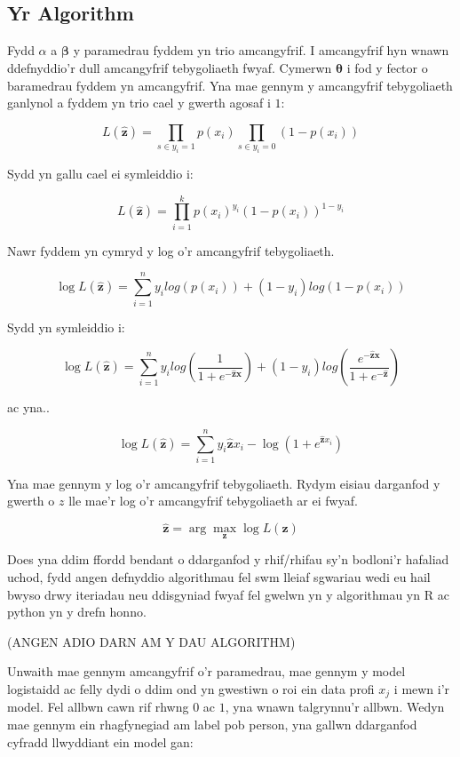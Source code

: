 \subsection{Yr Algorithm}

Fydd $\alpha$ a $\mathbf{\beta}$ y paramedrau fyddem yn trio amcangyfrif. I amcangyfrif hyn wnawn ddefnyddio'r dull amcangyfrif tebygoliaeth fwyaf. Cymerwn $\hat{\mathbf{\theta}}$ i fod y fector o baramedrau fyddem yn amcangyfrif. Yna mae gennym y amcangyfrif tebygoliaeth ganlynol a fyddem yn trio cael y gwerth agosaf i $1$:

$$ L(\hat{\mathbf{z}}) = \prod_{s \in y_{i}=1} p(x_i) \prod_{s \in y_{i}=0} (1 - p(x_i))$$

Sydd yn gallu cael ei symleiddio i:

$$ L(\hat{\mathbf{z}}) = \prod_{i=1}^{k} p(x_i)^{y_i} (1 - p(x_i))^{1-y_i} $$

Nawr fyddem yn cymryd y log o'r amcangyfrif tebygoliaeth.

$$ \log L(\hat{\mathbf{z}}) = \sum_{i=1}^{n} y_{i} log(p(x_{i})) + (1-y_{i}) log(1-p(x_{i})) $$

Sydd yn symleiddio i:

$$ \log L(\hat{\mathbf{z}}) = \sum_{i=1}^{n} y_{i} log(\frac{1}{1 + e^{-\hat{\mathbf{z}}\mathbf{x}}}) + (1 - y_i) log(\frac{e^{-\hat{\mathbf{z}}\mathbf{x}}}{1 + e^{-\hat{\mathbf{z}}}}) $$

ac yna..

$$ \log L(\hat{\mathbf{z}}) = \sum_{i=1}^{n} y_i \hat{\mathbf{z}} x_i - \log(1 + e^{\hat{\mathbf{z}} x_i}) $$

Yna mae gennym y log o'r amcangyfrif tebygoliaeth. Rydym eisiau darganfod y gwerth o $z$ lle mae'r log o'r amcangyfrif tebygoliaeth ar ei fwyaf.

$$ \hat{\mathbf{z}} = \arg \max_{\mathbf{z}} \log L(\mathbf{z})  $$

Does yna ddim ffordd bendant o ddarganfod y rhif/rhifau sy'n bodloni'r hafaliad uchod, fydd angen defnyddio algorithmau fel swm lleiaf sgwariau wedi eu hail bwyso drwy iteriadau neu ddisgyniad fwyaf fel gwelwn yn y algorithmau yn R ac python yn y drefn honno. 

(ANGEN ADIO DARN AM Y DAU ALGORITHM)

Unwaith mae gennym amcangyfrif o'r paramedrau, mae gennym y model logistaidd ac felly dydi o ddim ond yn gwestiwn o roi ein data profi $x_j$ i mewn i'r model. Fel allbwn cawn rif rhwng $0$ ac $1$, yna wnawn talgrynnu'r allbwn. Wedyn mae gennym ein rhagfynegiad am label pob person, yna gallwn ddarganfod cyfradd llwyddiant ein model gan:

